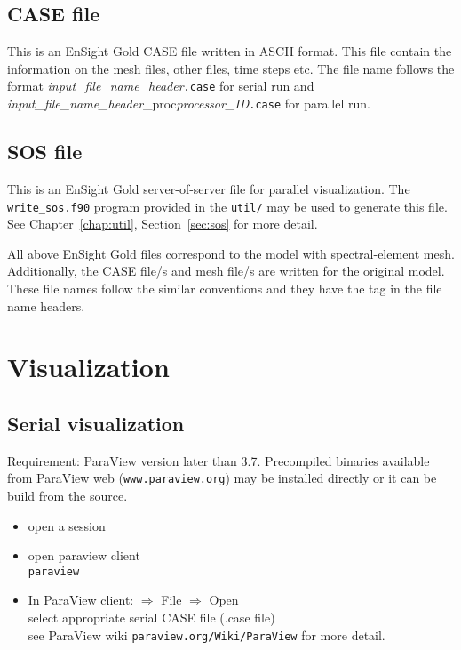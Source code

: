 \subsection{CASE file}

This is an EnSight Gold CASE file written in ASCII format. This file contain the information on the mesh files, other files, time steps etc. The file name follows the format \emph{input\_file\_name\_header}\texttt{.case} for serial run and \emph{input\_file\_name\_header}{\_proc}\emph{processor\_ID}\texttt{.case} for parallel run.

\subsection{SOS file}

This is an EnSight Gold server-of-server file for parallel visualization. The \texttt{write\_sos.f90} program provided in the \texttt{util/} may be used to generate this file. See Chapter~\ref{chap:util}, Section~\ref{sec:sos} for more detail.

All above EnSight Gold files correspond to the model with spectral-element mesh. Additionally, the CASE file/s and mesh file/s are written for the original model. These file names follow the similar conventions and they have the tag \texttt{} in the file name headers.

\section{Visualization}
\subsection{Serial visualization}

Requirement: ParaView version later than 3.7. Precompiled binaries available from ParaView web (\texttt{www.paraview.org}) may be installed directly or it can be build from the source.

\begin{itemize}
\item open a session
\item open paraview client \\
\texttt{paraview}
\item In ParaView client: $\Rightarrow$ File $\Rightarrow$ Open\\
   select appropriate serial CASE file (.case file)\\
   see ParaView wiki \texttt{paraview.org/Wiki/ParaView} for more detail.
\end{itemize}

